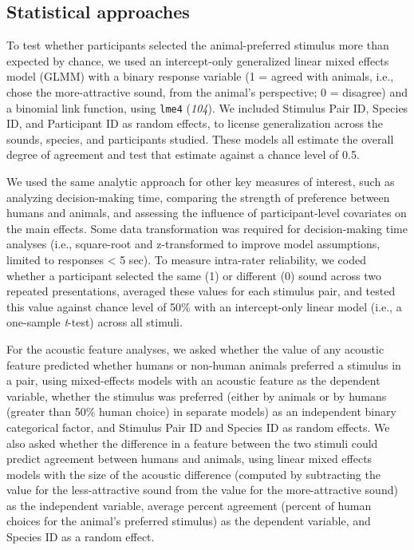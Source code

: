 \documentclass[
]{article}
\begin{document}
\subsection{Statistical approaches}\label{statistical-approaches}

To test whether participants selected the animal-preferred stimulus more
than expected by chance, we used an intercept-only generalized linear
mixed effects model (GLMM) with a binary response variable (1 = agreed
with animals, i.e., chose the more-attractive sound, from the animal's
perspective; 0 = disagree) and a binomial link function, using
\texttt{lme4} (\emph{104}). We included Stimulus Pair ID, Species ID,
and Participant ID as random effects, to license generalization across
the sounds, species, and participants studied. These models all estimate
the overall degree of agreement and test that estimate against a chance
level of 0.5.

We used the same analytic approach for other key measures of interest,
such as analyzing decision-making time, comparing the strength of
preference between humans and animals, and assessing the influence of
participant-level covariates on the main effects. Some data
transformation was required for decision-making time analyses (i.e.,
square-root and z-transformed to improve model assumptions, limited to
responses \textless{} 5 sec). To measure intra-rater reliability, we
coded whether a participant selected the same (1) or different (0) sound
across two repeated presentations, averaged these values for each
stimulus pair, and tested this value against chance level of 50\% with
an intercept-only linear model (i.e., a one-sample \emph{t}-test) across
all stimuli.

For the acoustic feature analyses, we asked whether the value of any
acoustic feature predicted whether humans or non-human animals preferred
a stimulus in a pair, using mixed-effects models with an acoustic
feature as the dependent variable, whether the stimulus was preferred
(either by animals or by humans (greater than 50\% human choice) in
separate models) as an independent binary categorical factor, and
Stimulus Pair ID and Species ID as random effects. We also asked whether
the difference in a feature between the two stimuli could predict
agreement between humans and animals, using linear mixed effects models
with the size of the acoustic difference (computed by subtracting the
value for the less-attractive sound from the value for the
more-attractive sound) as the independent variable, average percent
agreement (percent of human choices for the animal's preferred stimulus)
as the dependent variable, and Species ID as a random effect.
\end{document}
